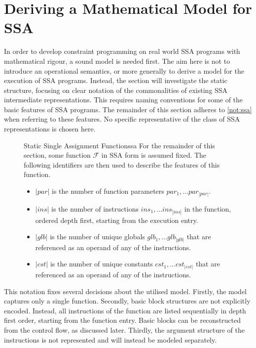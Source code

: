 \newpage
\section{Deriving a Mathematical Model for SSA}

    In order to develop constraint programming on real world SSA programs with
    mathematical rigour, a sound model is needed first.
    The aim here is not to introduce an operational semantics, or more
    generally to derive a model for the execution of SSA programs.
    Instead, the section will investigate the static structure, focusing on
    clear notation of the commonalities of existing SSA intermediate
    representations.
    This requires naming conventions for some of the basic features of
    SSA programs.
    The remainder of this section adheres to \autoref{not:ssa} when referring to
    these features.
    No specific representative of the class of SSA representations is chosen
    here.

\begin{figure}[h]
\begin{notation}{Static Single Assignment Function}{ssa}
    For the remainder of this section, some function $\mathcal F$ in SSA form is
    assumed fixed. 
    The following identifiers are then used to describe the features of this
    function.

    \begin{itemize}
    \item $|par|$ is the number of function parameters
          $par_1,\dots par_{|par|}$.
    \item $|ins|$ is the number of instructions $ins_1,\dots ins_{|ins|}$ in the
          function, ordered depth first, starting from the execution entry.
    \item $|glb|$ is the number of unique globals $glb_1,\dots glb_{|glb|}$ that
          are referenced as an operand of any of the instructions.
    \item $|cst|$ is the number of unique constants $cst_1,\dots cst_{|cst|}$
          that are referenced as an operand of any of the instructions.
    \end{itemize}
\end{notation}
\end{figure}

    This notation fixes several decisions about the utilised model.
    Firstly, the model captures only a single function.
    Secondly, basic block structures are not explicitly encoded.
    Instead, all instructions of the function are listed sequentially in depth
    first order, starting from the function entry.
    Basic blocks can be reconstructed from the control flow, as discussed later.
    Thirdly, the argument structure of the instructions is not represented and
    will instead be modeled separately.

